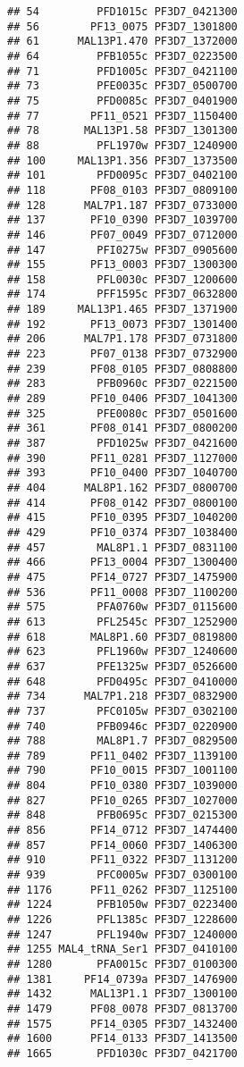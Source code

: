 \documentclass{article}\usepackage[]{graphicx}\usepackage[]{color}
\makeatletter
\newenvironment{kframe}{%
 \def\at@end@of@kframe{}%
 \ifinner\ifhmode%
  \def\at@end@of@kframe{\end{minipage}}%
  \begin{minipage}{\columnwidth}%
 \fi\fi%
 \def\FrameCommand##1{\hskip\@totalleftmargin \hskip-\fboxsep
 \colorbox{shadecolor}{##1}\hskip-\fboxsep
     \hskip-\linewidth \hskip-\@totalleftmargin \hskip\columnwidth}%
 \MakeFramed {\advance\hsize-\width
   \@totalleftmargin\z@ \linewidth\hsize
   \@setminipage}}%
 {\par\unskip\endMakeFramed%
 \at@end@of@kframe}
\newenvironment{knitrout}{}{} %
\makeatother
\begin{document}
\begin{knitrout}
\begin{kframe}
\begin{verbatim}
## 54         PFD1015c PF3D7_0421300
## 56        PF13_0075 PF3D7_1301800
## 61      MAL13P1.470 PF3D7_1372000
## 64         PFB1055c PF3D7_0223500
## 71         PFD1005c PF3D7_0421100
## 73         PFE0035c PF3D7_0500700
## 75         PFD0085c PF3D7_0401900
## 77        PF11_0521 PF3D7_1150400
## 78       MAL13P1.58 PF3D7_1301300
## 88         PFL1970w PF3D7_1240900
## 100     MAL13P1.356 PF3D7_1373500
## 101        PFD0095c PF3D7_0402100
## 118       PF08_0103 PF3D7_0809100
## 128      MAL7P1.187 PF3D7_0733000
## 137       PF10_0390 PF3D7_1039700
## 146       PF07_0049 PF3D7_0712000
## 147        PFI0275w PF3D7_0905600
## 155       PF13_0003 PF3D7_1300300
## 158        PFL0030c PF3D7_1200600
## 174        PFF1595c PF3D7_0632800
## 189     MAL13P1.465 PF3D7_1371900
## 192       PF13_0073 PF3D7_1301400
## 206      MAL7P1.178 PF3D7_0731800
## 223       PF07_0138 PF3D7_0732900
## 239       PF08_0105 PF3D7_0808800
## 283        PFB0960c PF3D7_0221500
## 289       PF10_0406 PF3D7_1041300
## 325        PFE0080c PF3D7_0501600
## 361       PF08_0141 PF3D7_0800200
## 387        PFD1025w PF3D7_0421600
## 390       PF11_0281 PF3D7_1127000
## 393       PF10_0400 PF3D7_1040700
## 404      MAL8P1.162 PF3D7_0800700
## 414       PF08_0142 PF3D7_0800100
## 415       PF10_0395 PF3D7_1040200
## 429       PF10_0374 PF3D7_1038400
## 457        MAL8P1.1 PF3D7_0831100
## 466       PF13_0004 PF3D7_1300400
## 475       PF14_0727 PF3D7_1475900
## 536       PF11_0008 PF3D7_1100200
## 575        PFA0760w PF3D7_0115600
## 613        PFL2545c PF3D7_1252900
## 618       MAL8P1.60 PF3D7_0819800
## 623        PFL1960w PF3D7_1240600
## 637        PFE1325w PF3D7_0526600
## 648        PFD0495c PF3D7_0410000
## 734      MAL7P1.218 PF3D7_0832900
## 737        PFC0105w PF3D7_0302100
## 740        PFB0946c PF3D7_0220900
## 788        MAL8P1.7 PF3D7_0829500
## 789       PF11_0402 PF3D7_1139100
## 790       PF10_0015 PF3D7_1001100
## 804       PF10_0380 PF3D7_1039000
## 827       PF10_0265 PF3D7_1027000
## 848        PFB0695c PF3D7_0215300
## 856       PF14_0712 PF3D7_1474400
## 857       PF14_0060 PF3D7_1406300
## 910       PF11_0322 PF3D7_1131200
## 939        PFC0005w PF3D7_0300100
## 1176      PF11_0262 PF3D7_1125100
## 1224       PFB1050w PF3D7_0223400
## 1226       PFL1385c PF3D7_1228600
## 1247       PFL1940w PF3D7_1240000
## 1255 MAL4_tRNA_Ser1 PF3D7_0410100
## 1280       PFA0015c PF3D7_0100300
## 1381     PF14_0739a PF3D7_1476900
## 1432      MAL13P1.1 PF3D7_1300100
## 1479      PF08_0078 PF3D7_0813700
## 1575      PF14_0305 PF3D7_1432400
## 1600      PF14_0133 PF3D7_1413500
## 1665       PFD1030c PF3D7_0421700

\end{verbatim}
\end{kframe}
\end{knitrout}
\end{document}
